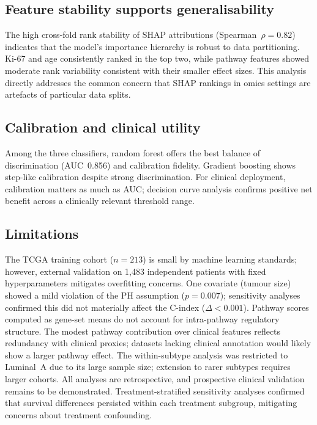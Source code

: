 \documentclass[review,12pt]{elsarticle}
\begin{document}
\subsection{Feature stability supports generalisability}
\label{sec:disc_stability}

The high cross-fold rank stability of SHAP attributions
(Spearman~$\rho = 0.82$) indicates that the model's importance hierarchy
is robust to data partitioning.  Ki-67 and age consistently ranked in
the top two, while pathway features showed moderate rank variability
consistent with their smaller effect sizes.  This analysis directly
addresses the common concern that SHAP rankings in omics settings are
artefacts of particular data splits.

\subsection{Calibration and clinical utility}
\label{sec:disc_calibration}

Among the three classifiers, random forest offers the best balance of
discrimination (AUC~0.856) and calibration fidelity.  Gradient boosting
shows step-like calibration despite strong discrimination.  For clinical
deployment, calibration matters as much as AUC; decision curve analysis
confirms positive net benefit across a clinically relevant threshold range.

\subsection{Limitations}
\label{sec:disc_limits}

The TCGA training cohort (\(n = 213\)) is small by machine learning
standards; however, external validation on 1,483 independent patients
with fixed hyperparameters mitigates overfitting concerns.  One covariate
(tumour size) showed a mild violation of the PH assumption ($p = 0.007$);
sensitivity analyses confirmed this did not materially affect the
C-index ($\Delta < 0.001$).  Pathway scores computed as gene-set means
do not account for intra-pathway regulatory structure.  The modest
pathway contribution over clinical features reflects redundancy with
clinical proxies; datasets lacking clinical annotation would likely show
a larger pathway effect.  The within-subtype analysis was restricted to
Luminal~A due to its large sample size; extension to rarer subtypes
requires larger cohorts.  All analyses are retrospective, and prospective
clinical validation remains to be demonstrated.  Treatment-stratified
sensitivity analyses confirmed that survival differences persisted within
each treatment subgroup, mitigating concerns about treatment confounding.
\end{document}
